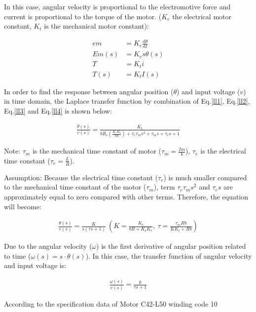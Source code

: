 \documentclass[conference]{IEEEtran}
\begin{document}
In this case, angular velocity is proportional to the electromotive force and current is proportional to the torque of the motor. ($K_e$ the electrical motor constant, $K_t$ is the mechanical motor constant):

\begin{align}
    em &= K_e \frac{\textrm{d} \theta}{\textrm{d} t}\\
    Em(s) &= K_e s \theta(s)\\ \label{ll3}
    T &= K_t i\\
    T(s) &= K_t I(s) \label{ll4}
\end{align}

In order to find the response between angular position ($\theta$) and input voltage ($v$) in time domain, the Laplace transfer function by combination of Eq.\ref{ll1}, Eq.\ref{ll2}, Eq.\ref{ll3} and Eq.\ref{ll4} is shown below:

\begin{align}
    \frac{\theta (s)}{v(s)} = \frac{K_t}{bR_s (\frac{K_e K_t}{bR}) + \tau_e \tau_m s^2 + \tau_m s + \tau_e s +1}
\end{align}

Note: $\tau_m$ is the mechanical time constant of motor ($\tau_m=\frac{Im}{b}$), $\tau_e$ is the electrical time constant ($\tau_e=\frac{L}{R}$).

Assumption: Because the electrical time constant ($\tau_e$) is much smaller compared to the mechanical time constant of the motor ($\tau_m$), term $\tau_e\tau_ms^2$ and $\tau_es$ are approximately equal to zero compared with other terms. Therefore, the equation will become:

\begin{align}
    \frac{\theta (s)}{v(s)} = \frac{K}{s(\tau s + 1)} \ \left( K = \frac{K_t}{bR + K_t K_e}, \ \tau = \frac{\tau_m Rb}{K K_t + Rb} \right)
\end{align}

Due to the angular velocity ($\omega$) is the first derivative of angular position related to time ($\omega\left(s\right)=s\cdot\theta\left(s\right)$). In this case, the transfer function of angular velocity and input voltage is:

\begin{align}
    \frac{\omega(s)}{v(s)} = \frac{k}{\tau s + 1}
\end{align}

According to the specification data of Motor C42-L50 winding code 10 
\end{document}
